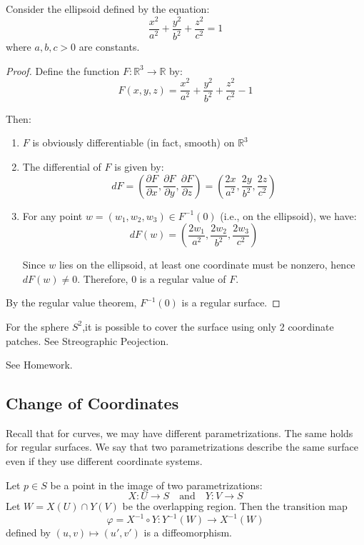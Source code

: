 \documentclass{article}
\begin{document}
\begin{example}
Consider the ellipsoid defined by the equation:
\[
\frac{x^2}{a^2} + \frac{y^2}{b^2} + \frac{z^2}{c^2} = 1
\]
where $a, b, c > 0$ are constants.
\begin{proof}
Define the function $F: \mathbb{R}^3 \rightarrow \mathbb{R}$ by:
\[
F(x, y, z) = \frac{x^2}{a^2} + \frac{y^2}{b^2} + \frac{z^2}{c^2} - 1
\]

Then:
\begin{enumerate}
    \item $F$ is obviously differentiable (in fact, smooth) on $\mathbb{R}^3$
    
    \item The differential of $F$ is given by:
    \[
    dF = \left( \frac{\partial F}{\partial x}, \frac{\partial F}{\partial y}, \frac{\partial F}{\partial z} \right) = \left( \frac{2x}{a^2}, \frac{2y}{b^2}, \frac{2z}{c^2} \right)
    \]
    
    \item For any point $w = (w_1, w_2, w_3) \in F^{-1}(0)$ (i.e., on the ellipsoid), we have:
    \[
    dF(w) = \left( \frac{2w_1}{a^2}, \frac{2w_2}{b^2}, \frac{2w_3}{c^2} \right)
    \]
    
    Since $w$ lies on the ellipsoid, at least one coordinate must be nonzero, hence $dF(w) \neq 0$. Therefore, 0 is a regular value of $F$.
\end{enumerate}

By the regular value theorem, $F^{-1}(0)$ is a regular surface.
\end{proof}
\end{example}

\begin{remark}
    For the sphere $S^2$,it is possible to cover the surface using only 2 coordinate patches. See Streographic Peojection.
\end{remark}
\begin{example}
    See Homework.
\end{example}
\subsection{Change of Coordinates}
Recall that for curves, we may have different parametrizations. The same holds for regular surfaces. We say that two parametrizations describe the same surface even if they use different coordinate systems.

\begin{proposition}
Let $p \in S$ be a point in the image of two parametrizations:
\[
X: U \rightarrow S \quad \text{and} \quad Y: V \rightarrow S
\]
Let $W = X(U) \cap Y(V)$ be the overlapping region. Then the transition map
\[
\varphi = X^{-1} \circ Y: Y^{-1}(W) \rightarrow X^{-1}(W)
\]
defined by $(u,v) \mapsto (u',v')$ is a diffeomorphism.
\end{proposition}
\end{document}
